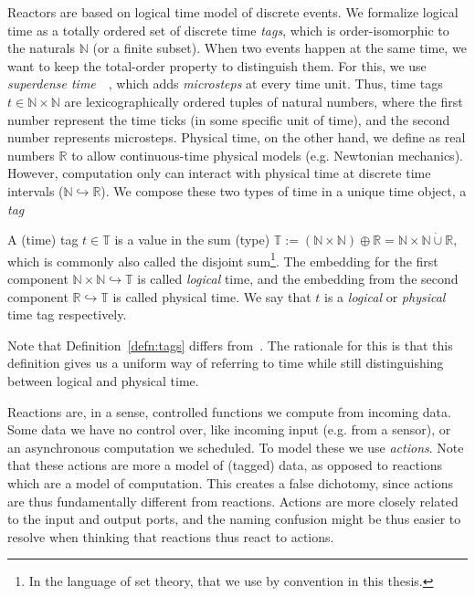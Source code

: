 Reactors are based on logical time model of discrete events.
We formalize logical time as a totally ordered set of discrete time \emph{tags}, which is order-isomorphic to the naturals $\mathbb{N}$ (or a finite subset). 
When two events happen at the same time, we want to keep the total-order property to distinguish them.
For this, we use \emph{superdense time}~\cite{superdense,Ptolemaeus:14:SystemDesign}~, which adds \emph{microsteps} at every time unit.
Thus, time tags $t \in \mathbb{N} \times \mathbb{N}$ are lexicographically ordered tuples of natural numbers, where the first number represent the time ticks (in some specific unit of time), and the second number represents microsteps.
Physical time, on the other hand, we define as real numbers $\mathbb{R}$ to allow continuous-time physical models (e.g. Newtonian mechanics).
However, computation only can interact with physical time at discrete time intervals ($\mathbb{N} \hookrightarrow \mathbb{R}$).
We compose these two types of time in a unique time object, a \emph{tag}

\begin{defn}[tag]
    \label{defn:tags}
   A (time) tag $t \in \mathbb{T}$ is a value in the sum (type) $\mathbb{T} := (\mathbb{N} \times \mathbb{N}) \oplus \mathbb{R} = \mathbb{N} \times \mathbb{N} \dot{\cup} \mathbb{R}$, which is commonly also called the disjoint sum\footnote{In the language of set theory, that we use by convention in this thesis.}.
   The embedding for the first component $\mathbb{N} \times \mathbb{N} \hookrightarrow \mathbb{T}$ is called \emph{logical} time, and the embedding from the second component $\mathbb{R} \hookrightarrow \mathbb{T}$ is called physical time.
   We say that $t$ is a \emph{logical} or \emph{physical} time tag respectively.
\end{defn}

Note that Definition~\ref{defn:tags} differs from~\cite{lohstroh_cyphy19,lohstroh_phdthesis}.
The rationale for this is that this definition gives us a uniform way of referring to time while still distinguishing between logical and physical time.

Reactions are, in a sense, controlled functions we compute from incoming data. 
Some data we have no control over, like incoming input (e.g. from a sensor), or an asynchronous computation we scheduled.
To model these we use \emph{actions}.
Note that these actions are more a model of (tagged) data, as opposed to reactions which are a model of computation.
This creates a false dichotomy, since actions are thus fundamentally different from reactions.
Actions are more closely related to the input and output ports, and the naming confusion might be thus easier to resolve when thinking that reactions thus react to actions.

